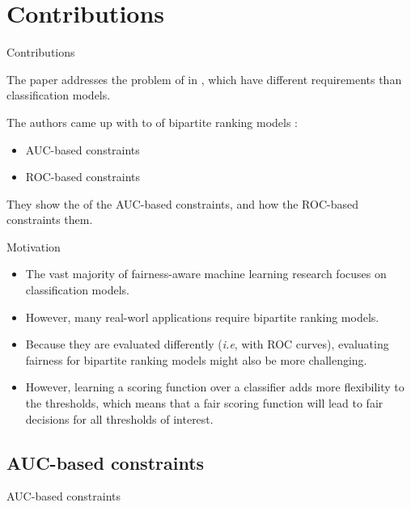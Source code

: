 \section{Contributions}
\begin{frame}{Contributions}

    The paper addresses the problem of  in , which have different requirements than classification models.
    
    The authors came up with  to  of bipartite ranking models :
  \begin{itemize}
      \item AUC-based constraints
      \item ROC-based constraints
  \end{itemize}
  
  They show the  of the AUC-based constraints, and how the ROC-based constraints  them.
\end{frame}

\begin{frame}{Motivation}
    \begin{itemize}
        \item The vast majority of fairness-aware machine learning research focuses on classification models.
        \item However, many real-worl applications require bipartite ranking models. 
        \item Because they are evaluated differently (\textit{i.e}, with ROC curves), evaluating fairness for bipartite ranking models might also be more challenging.        
        \item However, learning a scoring function over a classifier adds more flexibility to the thresholds, which means that a fair scoring function will lead to fair decisions for all thresholds of interest.
    \end{itemize}
\end{frame}


\subsection{AUC-based constraints}
\begin{frame}{AUC-based constraints}

\end{frame}

